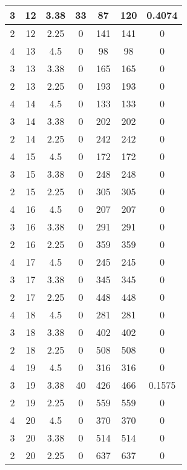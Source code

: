 \documentclass[letterpaper, 12pt]{article}
\begin{document}
\begin{longtable}{|c|c|c|c|c|c|c|}
\hline
3 & 12 & 3.38 & 33 & 87 & 120 & 0.4074 \\
\hline
2 & 12 & 2.25 & 0 & 141 & 141 & 0 \\
\hline
4 & 13 & 4.5 & 0 & 98 & 98 & 0 \\
\hline
3 & 13 & 3.38 & 0 & 165 & 165 & 0 \\
\hline
2 & 13 & 2.25 & 0 & 193 & 193 & 0 \\
\hline
4 & 14 & 4.5 & 0 & 133 & 133 & 0 \\
\hline
3 & 14 & 3.38 & 0 & 202 & 202 & 0 \\
\hline
2 & 14 & 2.25 & 0 & 242 & 242 & 0 \\
\hline
4 & 15 & 4.5 & 0 & 172 & 172 & 0 \\
\hline
3 & 15 & 3.38 & 0 & 248 & 248 & 0 \\
\hline
2 & 15 & 2.25 & 0 & 305 & 305 & 0 \\
\hline
4 & 16 & 4.5 & 0 & 207 & 207 & 0 \\
\hline
3 & 16 & 3.38 & 0 & 291 & 291 & 0 \\
\hline
2 & 16 & 2.25 & 0 & 359 & 359 & 0 \\
\hline
4 & 17 & 4.5 & 0 & 245 & 245 & 0 \\
\hline
3 & 17 & 3.38 & 0 & 345 & 345 & 0 \\
\hline
2 & 17 & 2.25 & 0 & 448 & 448 & 0 \\
\hline
4 & 18 & 4.5 & 0 & 281 & 281 & 0 \\
\hline
3 & 18 & 3.38 & 0 & 402 & 402 & 0 \\
\hline
2 & 18 & 2.25 & 0 & 508 & 508 & 0 \\
\hline
4 & 19 & 4.5 & 0 & 316 & 316 & 0 \\
\hline
3 & 19 & 3.38 & 40 & 426 & 466 & 0.1575 \\
\hline
2 & 19 & 2.25 & 0 & 559 & 559 & 0 \\
\hline
4 & 20 & 4.5 & 0 & 370 & 370 & 0 \\
\hline
3 & 20 & 3.38 & 0 & 514 & 514 & 0 \\
\hline
2 & 20 & 2.25 & 0 & 637 & 637 & 0 \\
\hline
\end{longtable}
\end{document}
